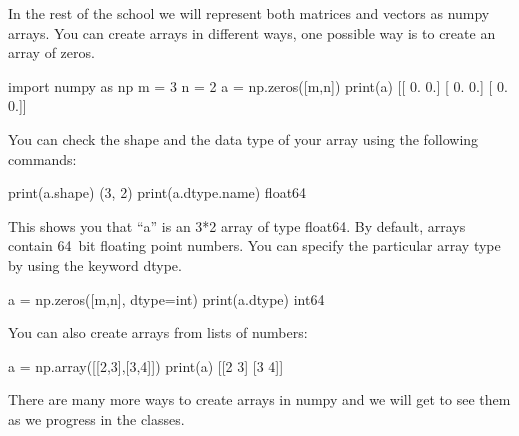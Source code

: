\begin{exercise}
In the rest of the school we will represent both matrices and vectors as numpy arrays. You can create arrays in different ways, one possible way is to create an array of zeros.
\begin{python}
import numpy as np
m = 3
n = 2
a = np.zeros([m,n])
print(a)
[[ 0.  0.]
 [ 0.  0.]
 [ 0.  0.]]
\end{python}

You can check the shape and the data type of your array using the following commands:
\begin{python}
print(a.shape)
(3, 2)
print(a.dtype.name)
float64
\end{python}
This shows you that ``a'' is an 3*2 array of type float64. By default, arrays contain 64~bit\footnotemark{} floating point numbers. You can specify the particular array type by using the keyword dtype.

\begin{python}
a = np.zeros([m,n], dtype=int)
print(a.dtype)
int64
\end{python}

\smallskip

You can also create arrays from lists of numbers:
\begin{python}
a = np.array([[2,3],[3,4]])
print(a)
[[2 3]
 [3 4]]
\end{python}

There are many more ways to create arrays in numpy and we will get to see them as we progress in the classes.

\end{exercise}

